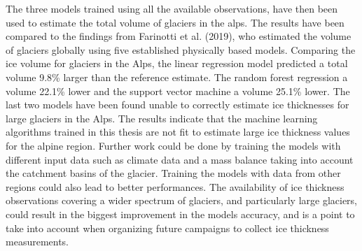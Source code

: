 The three models trained using all the available observations, have then been used to estimate the total volume of glaciers in the alps. The results have been compared to the findings from Farinotti et al. (2019), who estimated the volume of glaciers globally using five established physically based models. Comparing the ice volume for glaciers in the Alps, the linear regression model predicted a total volume 9.8\% larger than the reference estimate. The random forest regression a volume 22.1\% lower and the support vector machine a volume 25.1\% lower. The last two models have been found unable to correctly estimate ice thicknesses for large glaciers in the Alps. The results indicate that the machine learning algorithms trained in this thesis are not fit to estimate large ice thickness values for the alpine region. Further work could be done by training the models with different input data such as climate data and a mass balance taking into account the catchment basins of the glacier. Training the models with data from other regions could also lead to better performances. The availability of ice thickness observations covering a wider spectrum of glaciers, and particularly large glaciers, could result in the biggest improvement in the models accuracy, and is a point to take into account when organizing future campaigns to collect ice thickness measurements.
